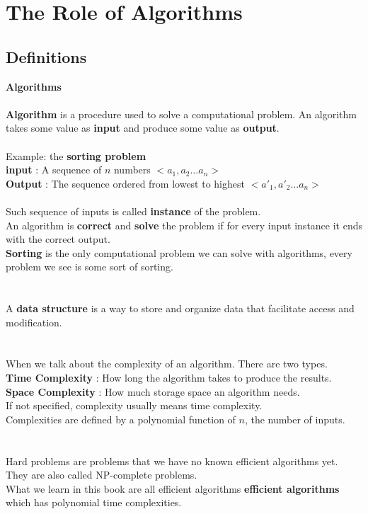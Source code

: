 \chapter{The Role of Algorithms}
\section{Definitions}
{\Large\textbf{Algorithms}}\\\\ 
\textbf{Algorithm} is a procedure used to solve a computational problem.
An algorithm takes some value as \textbf{input} and produce some value as \textbf{output}.
\\\\
Example: the \textbf{sorting problem}\\
\indent \textbf{input} : A sequence of $n$ numbers $<a_1,a_2\dots a_n>$\\
\indent \textbf{Output} : The sequence ordered from lowest to highest $<a'_{1},a'_{2}\dots a_n>$
\\\\
Such sequence of inputs is called \textbf{instance} of the problem.\\
An algorithm is \textbf{correct} and \textbf{solve} the problem if for every input instance it ends with the correct output.\\
\textbf{Sorting} is the only computational problem we can solve with algorithms, every problem we see is some sort of sorting.\\ 
\\
\\ 
A \textbf{data structure} is a way to store and organize data that facilitate access and modification. 
\\\\
\\
When we talk about the complexity of an algorithm. There are two types.\\
\indent \textbf{Time Complexity} : How long the algorithm takes to produce the results. \\
\indent\textbf{Space Complexity} : How much storage space an algorithm needs.\\
If not specified, complexity usually means time complexity.\\
Complexities are defined by a polynomial function of $n$, the number of inputs.
\\\\
\\ 
Hard problems are problems that we have no known efficient algorithms yet. They are also called NP-complete problems.\\
What we learn in this book are all efficient algorithms \textbf{efficient algorithms} which has polynomial time complexities. 


